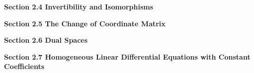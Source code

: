 \documentclass[11pt,largemargins]{homework}
\begin{document}
\textbf{\large{Section 2.4} Invertibility and Isomorphisms}
\setcounter{questionCounter}{0}
\question

\question

\question

\question

\question

\question

\question

\question

\question

\question

\textbf{\large{Section 2.5} The Change of Coordinate Matrix}
\setcounter{questionCounter}{0}
\question

\question

\question

\question

\question

\question

\question

\question

\question

\question

\textbf{\large{Section 2.6} Dual Spaces}
\setcounter{questionCounter}{0}
\question

\question

\question

\question

\question

\question

\question

\question

\question

\question

\textbf{\large{Section 2.7} Homogeneous Linear Differential Equations with Constant Coefficients}
\setcounter{questionCounter}{0}
\question

\question

\question

\question

\question

\question

\question

\question

\question

\question
\end{document}
